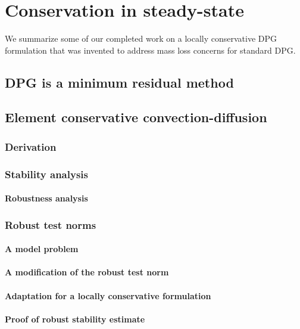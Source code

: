 \documentclass[12pt]{report}
\begin{document}
\chapter{Conservation in steady-state}
We summarize some of our completed work on a locally conservative DPG formulation that was invented to address mass loss concerns for standard DPG.


\section{DPG is a minimum residual method}


\section{Element conservative convection-diffusion}

\subsection{Derivation}

\subsection{Stability analysis}
\subsubsection{Robustness analysis}

\subsection{Robust test norms}
\subsubsection{A model problem}
\subsubsection{A modification of the robust test norm}
\subsubsection{Adaptation for a locally conservative formulation}
\subsubsection{Proof of robust stability estimate}
\end{document}
